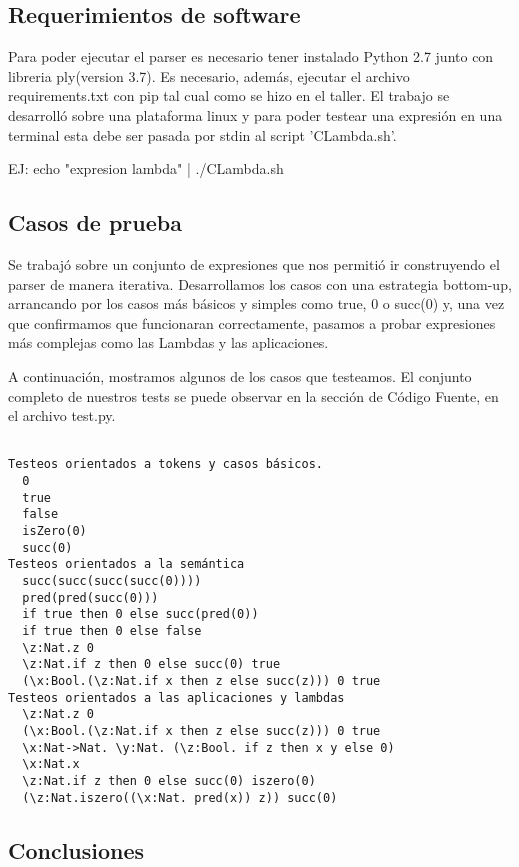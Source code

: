\subsection{Requerimientos de software}

Para poder ejecutar el parser es necesario tener instalado Python 2.7 junto con libreria ply(version 3.7). 
Es necesario, además, ejecutar el archivo requirements.txt con pip tal cual como se hizo en el taller.
El trabajo se desarrolló sobre una plataforma linux y para poder testear una expresión en una terminal esta 
debe ser pasada por stdin al script 'CLambda.sh'. 

EJ: echo "expresion lambda" | ./CLambda.sh 

\subsection{Casos de prueba} 

Se trabajó sobre un conjunto de expresiones que nos permitió ir construyendo el parser de manera iterativa. 
Desarrollamos los casos con una estrategia bottom-up, arrancando por los casos más básicos y simples como 
true, 0 o succ(0) y, una vez que confirmamos que funcionaran correctamente, pasamos a probar expresiones más 
complejas como las Lambdas y las aplicaciones. 

A continuación, mostramos algunos de los casos que testeamos. El conjunto completo de nuestros tests se puede
observar en la sección de Código Fuente, en el archivo test.py.

\begin{verbatim}
  
Testeos orientados a tokens y casos básicos.
  0
  true
  false
  isZero(0)
  succ(0)
Testeos orientados a la semántica 
  succ(succ(succ(succ(0))))
  pred(pred(succ(0)))
  if true then 0 else succ(pred(0))
  if true then 0 else false
  \z:Nat.z 0
  \z:Nat.if z then 0 else succ(0) true
  (\x:Bool.(\z:Nat.if x then z else succ(z))) 0 true
Testeos orientados a las aplicaciones y lambdas
  \z:Nat.z 0
  (\x:Bool.(\z:Nat.if x then z else succ(z))) 0 true
  \x:Nat->Nat. \y:Nat. (\z:Bool. if z then x y else 0)
  \x:Nat.x
  \z:Nat.if z then 0 else succ(0) iszero(0)
  (\z:Nat.iszero((\x:Nat. pred(x)) z)) succ(0)

\end{verbatim}

\subsection{Conclusiones}
 
